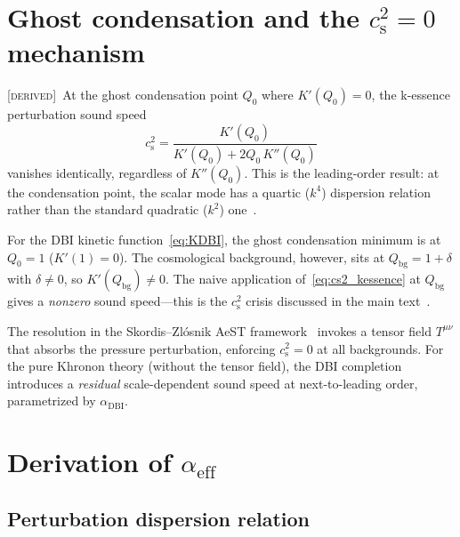 \documentclass[prd,twocolumn,superscriptaddress,longbibliography,floatfix]{revtex4-2}
\newcommand{\cs}{c_{\mathrm{s}}}
\newcommand{\derived}{\textsc{[derived]}}
\begin{document}
\section{Ghost condensation and the $\cs^2 = 0$ mechanism}
\label{sec:ghost}

\derived\ At the ghost condensation point $Q_0$ where
$K'(Q_0) = 0$, the k-essence perturbation sound speed
\begin{equation}
\cs^2 = \frac{K'(Q_0)}{K'(Q_0) + 2Q_0\,K''(Q_0)}
\label{eq:cs2_kessence}
\end{equation}
vanishes identically, regardless of $K''(Q_0)$.  This
is the leading-order result: at the condensation point,
the scalar mode has a quartic ($k^4$) dispersion
relation rather than the standard quadratic ($k^2$)
one~\cite{AHCLM2004}.

For the DBI kinetic function~\eqref{eq:KDBI}, the
ghost condensation minimum is at $Q_0 = 1$
($K'(1) = 0$).  The cosmological background, however,
sits at $Q_{\mathrm{bg}} = 1 + \delta$ with
$\delta \neq 0$, so $K'(Q_{\mathrm{bg}}) \neq 0$.
The naive application of~\eqref{eq:cs2_kessence} at
$Q_{\mathrm{bg}}$ gives a \emph{nonzero} sound speed---this
is the $\cs^2$ crisis discussed in the main
text~\cite{Paper3}.

The resolution in the Skordis--Zl\'{o}snik
AeST framework~\cite{SZ2021prl,BS2025} invokes a
tensor field $T^{\mu\nu}$ that absorbs the pressure
perturbation, enforcing $\cs^2 = 0$ at all backgrounds.
For the pure Khronon theory (without the tensor field),
the DBI completion introduces a \emph{residual} scale-dependent
sound speed at next-to-leading order, parametrized by
$\alpha_{\mathrm{DBI}}$.


\section{Derivation of $\alpha_{\mathrm{eff}}$}
\label{sec:derivation}

\subsection{Perturbation dispersion relation}
\label{sec:dispersion}
\end{document}
